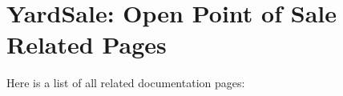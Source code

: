 \section{Yard\-Sale: Open Point of Sale Related Pages}
Here is a list of all related documentation pages:\begin{CompactList}
\item {}

\item {}

\end{CompactList}
